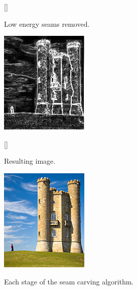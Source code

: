 \begin{figure}[htp]
    \begin{subfloatrow}
        [\FBwidth]
        {\caption{Low energy seams removed.}\label{fig:scRemoved}}
        {\includegraphics[scale=.7]{figures/seamCarving4.png}}
    \end{subfloatrow}
    \begin{subfloatrow}
        [\FBwidth]
        {\caption{Resulting image.}}
        {\includegraphics[scale=.7]{figures/seamCarving5.png}}
    \end{subfloatrow}
    \caption[Seam Carving Stages]{Each stage of the seam carving algorithm.}
\end{figure}
